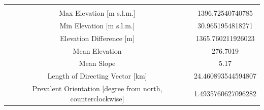 \documentclass[11pt,]{article}
\begin{document}
\begin{longtable}[]{@{}cc@{}}
\begin{minipage}[t]{0.29\columnwidth}
\end{minipage}\tabularnewline
\begin{minipage}[t]{0.65\columnwidth}\centering\strut
Max Elevation {[}m s.l.m.{]}\strut
\end{minipage} & \begin{minipage}[t]{0.29\columnwidth}\centering\strut
1396.72540740785\strut
\end{minipage}\tabularnewline
\begin{minipage}[t]{0.65\columnwidth}\centering\strut
Min Elevation {[}m s.l.m.{]}\strut
\end{minipage} & \begin{minipage}[t]{0.29\columnwidth}\centering\strut
30.9651954818271\strut
\end{minipage}\tabularnewline
\begin{minipage}[t]{0.65\columnwidth}\centering\strut
Elevation Difference {[}m{]}\strut
\end{minipage} & \begin{minipage}[t]{0.29\columnwidth}\centering\strut
1365.760211926023\strut
\end{minipage}\tabularnewline
\begin{minipage}[t]{0.65\columnwidth}\centering\strut
Mean Elevation\strut
\end{minipage} & \begin{minipage}[t]{0.29\columnwidth}\centering\strut
276.7019\strut
\end{minipage}\tabularnewline
\begin{minipage}[t]{0.65\columnwidth}\centering\strut
Mean Slope\strut
\end{minipage} & \begin{minipage}[t]{0.29\columnwidth}\centering\strut
5.17\strut
\end{minipage}\tabularnewline
\begin{minipage}[t]{0.65\columnwidth}\centering\strut
Length of Directing Vector {[}km{]}\strut
\end{minipage} & \begin{minipage}[t]{0.29\columnwidth}\centering\strut
24.460893544594807\strut
\end{minipage}\tabularnewline
\begin{minipage}[t]{0.65\columnwidth}\centering\strut
Prevalent Orientation {[}degree from north, counterclockwise{]}\strut
\end{minipage} & \begin{minipage}[t]{0.29\columnwidth}\centering\strut
1.4935760627096282\strut

\end{minipage}
\end{longtable}
\end{document}
